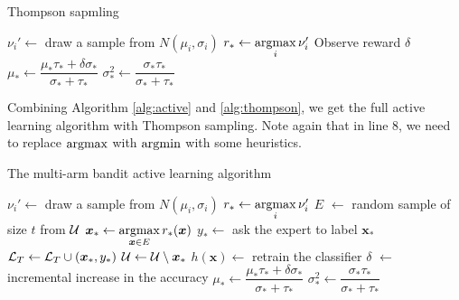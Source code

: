 \begin{algorithm}[h]
	\caption{Thompson sapmling}
	\label{alg:thompson}
	\begin{algorithmic}[1]
            		\State $\nu_i' \leftarrow$ draw a sample from $N(\mu_i, \sigma_i)$
        		\Endforeach
        		\State $r_* \leftarrow \argmax_{i} \nu_i'$
        		\State Observe reward $\delta$
        		\State $\mu_* \leftarrow \dfrac{\mu_* \tau_* + \delta \sigma_*}{\sigma_* + \tau_*}$
        		\State $\sigma_*^2 \leftarrow \dfrac{\sigma_* \tau_*}{\sigma_* + \tau_*}$
    		\Endforeach
		\EndProcedure
	\end{algorithmic}
\end{algorithm}

Combining Algorithm \ref{alg:active} and \ref{alg:thompson}, we get the full active learning
algorithm with Thompson sampling. Note again that in line 8, we need to replace
$\argmax$ with $\argmin$ with some heuristics.

\begin{algorithm}[h]
	\caption{The multi-arm bandit active learning algorithm}
	\label{alg:bandit}
	\begin{algorithmic}[1]
        			\State $\nu_i' \leftarrow$ draw a sample from $N(\mu_i, \sigma_i)$
        		\Endforeach
        		\State $r_* \leftarrow \argmax_{i} \nu_i'$
        		\State $E$ $\leftarrow$ random sample of size $t$ from $\mathcal{U}$
        		\State $\bm{x}_* \leftarrow \argmax_{\bm{x} \in E} r_*(\bm{x})$
        		\State $y_* \leftarrow$ ask the expert to label $\bm{x}_*$
        		\State $\mathcal{L}_T \leftarrow \mathcal{L}_T  \cup (\bm{x}_*, y_*)$
        		\State $\mathcal{U} \leftarrow \mathcal{U} \setminus \bm{x}_*$
        		\State $h(\bm{x}) \leftarrow$ retrain the classifier
        		\State $\delta$ $\leftarrow$ incremental increase in the accuracy
        		\State $\mu_* \leftarrow \dfrac{\mu_* \tau_* + \delta \sigma_*}{\sigma_* + \tau_*}$
                \State $\sigma_*^2 \leftarrow \dfrac{\sigma_* \tau_*}{\sigma_* + \tau_*}$
    		\EndWhile
		\EndProcedure
	\end{algorithmic}
\end{algorithm}

